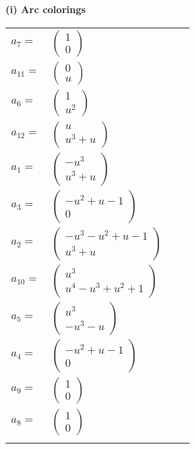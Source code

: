 \documentclass[1p]{elsarticle_modified}
\theoremstyle{definition}
\begin{document}
\flushleft \textbf{(i) Arc colorings}\\
\begin{tabular}{m{7pt} m{180pt} m{7pt} m{180pt} }
\flushright $a_{7}=$&$\begin{pmatrix}1\\0\end{pmatrix}$ \\
\flushright $a_{11}=$&$\begin{pmatrix}0\\u\end{pmatrix}$ \\
\flushright $a_{6}=$&$\begin{pmatrix}1\\u^2\end{pmatrix}$ \\
\flushright $a_{12}=$&$\begin{pmatrix}u\\u^3+u\end{pmatrix}$ \\
\flushright $a_{1}=$&$\begin{pmatrix}- u^3\\u^3+u\end{pmatrix}$ \\
\flushright $a_{3}=$&$\begin{pmatrix}- u^2+u-1\\0\end{pmatrix}$ \\
\flushright $a_{2}=$&$\begin{pmatrix}- u^3- u^2+u-1\\u^3+u\end{pmatrix}$ \\
\flushright $a_{10}=$&$\begin{pmatrix}u^3\\u^4- u^3+u^2+1\end{pmatrix}$ \\
\flushright $a_{5}=$&$\begin{pmatrix}u^3\\- u^3- u\end{pmatrix}$ \\
\flushright $a_{4}=$&$\begin{pmatrix}- u^2+u-1\\0\end{pmatrix}$ \\
\flushright $a_{9}=$&$\begin{pmatrix}1\\0\end{pmatrix}$ \\
\flushright $a_{8}=$&$\begin{pmatrix}1\\0\end{pmatrix}$\\&\end{tabular}
\end{document}
